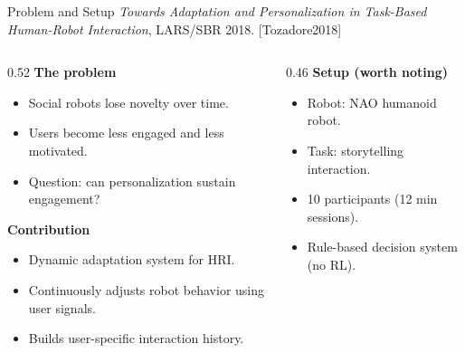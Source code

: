 \documentclass[aspectratio=169,10pt]{beamer}
\newcommand{\refnum}[1]{{\footnotesize\color{giuaccent}[#1]}}
\begin{document}
\begin{frame}{Problem and Setup}
\footnotesize \emph{Towards Adaptation and Personalization in Task-Based Human-Robot Interaction}, LARS/SBR 2018. \refnum{Tozadore2018}

\vspace{0.4em}

\begin{columns}[T]

\begin{column}{0.52\textwidth}
\textbf{The problem}
\begin{itemize}\footnotesize
    \item Social robots lose novelty over time.
    \item Users become less engaged and less motivated.
    \item Question: can personalization sustain engagement?
\end{itemize}

\textbf{Contribution}
\begin{itemize}\footnotesize
    \item Dynamic adaptation system for HRI.
    \item Continuously adjusts robot behavior using user signals.
    \item Builds user-specific interaction history.
\end{itemize}
\end{column}

\begin{column}{0.46\textwidth}
\textbf{Setup (worth noting)}
\begin{itemize}\footnotesize
    \item Robot: NAO humanoid robot.
    \item Task: storytelling interaction.
    \item 10 participants (12 min sessions).
    \item Rule-based decision system (no RL).
\end{itemize}
\end{column}

\end{columns}
\end{frame}

\end{document}
